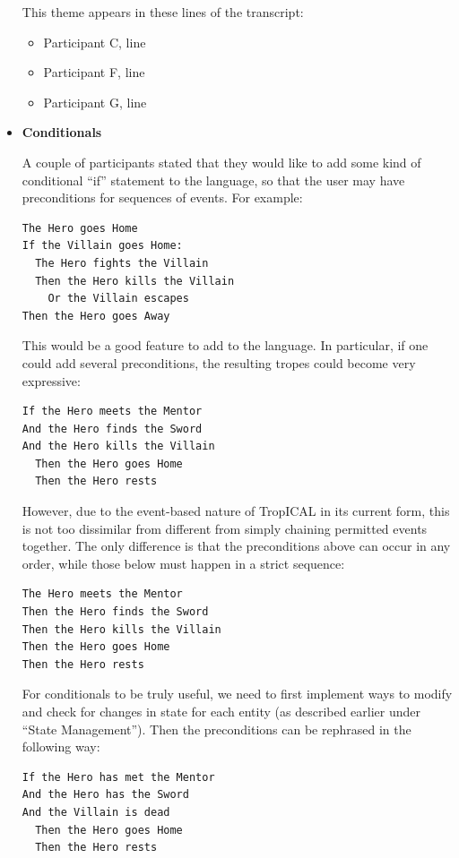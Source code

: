 \documentclass[11pt]{report}
\begin{document}
\begin{itemize}
This theme appears in these lines of the transcript:

\begin{itemize}
\item Participant C, line~
\item Participant F, line~
\item Participant G, line~
\end{itemize}

\item \textbf{Conditionals}

A couple of participants stated that they would like to add some kind of
conditional ``if'' statement to the language, so that the user may have
preconditions for sequences of events. For example:

\begin{verbatim}
The Hero goes Home
If the Villain goes Home:
  The Hero fights the Villain
  Then the Hero kills the Villain
    Or the Villain escapes
Then the Hero goes Away
\end{verbatim}

This would be a good feature to add to the language. In particular, if one could
add several preconditions, the resulting tropes could become very expressive:

\begin{verbatim}
If the Hero meets the Mentor
And the Hero finds the Sword
And the Hero kills the Villain
  Then the Hero goes Home
  Then the Hero rests
\end{verbatim}

However, due to the event-based nature of TropICAL in its current form, this is
not too dissimilar from different from simply chaining permitted events
together. The only difference is that the preconditions above can occur in any
order, while those below must happen in a strict sequence:

\begin{verbatim}
The Hero meets the Mentor
Then the Hero finds the Sword
Then the Hero kills the Villain
Then the Hero goes Home
Then the Hero rests
\end{verbatim}

For conditionals to be truly useful, we need to first implement ways to modify
and check for changes in state for each entity (as described earlier under
``State Management''). Then the preconditions can be rephrased in the following way:

\begin{verbatim}
If the Hero has met the Mentor
And the Hero has the Sword
And the Villain is dead
  Then the Hero goes Home
  Then the Hero rests
\end{verbatim}


\end{itemize}
\end{document}
